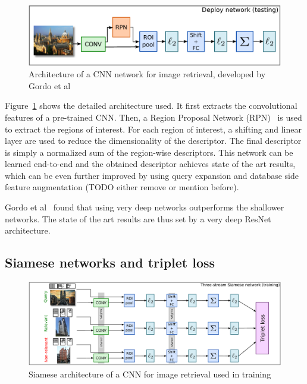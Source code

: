 \begin{figure}
\includegraphics[width=\textwidth]{img/gordo_deepimageretrievaldeploy.png}
\caption{Architecture of a CNN network for image retrieval, developed by
Gordo et al~\cite{gordo_deep_2016}
\label{fig:gordo_deploy}}
\end{figure}
Figure~\ref{fig:gordo_deploy} shows the detailed architecture used.
It first extracts the convolutional features of a pre-trained
CNN. Then, a Region Proposal Network (RPN)~\cite{ren_faster_2015} is
used to extract the regions of interest. For each region of interest,
a shifting and linear layer are used to reduce the dimensionality of
the descriptor. The final descriptor is simply a normalized sum of the
region-wise descriptors. This network can be learned end-to-end and
the obtained descriptor achieves state of the art results, which can
be even further improved by using query expansion and database side
feature augmentation (TODO either remove or mention before).

Gordo et al~\cite{gordo_deep_2016} found that using very deep networks
outperforms the shallower networks. The state of the art results are
thus set by a very deep ResNet architecture.

\subsection{Siamese networks and triplet loss}
\begin{figure}
\includegraphics[width=\textwidth]{img/gordo_deepimageretrievalarc.png}
\caption{Siamese architecture of a CNN for image retrieval used in
training~\cite{gordo_deep_2016}
\label{fig:gordo_train}}
\end{figure}


